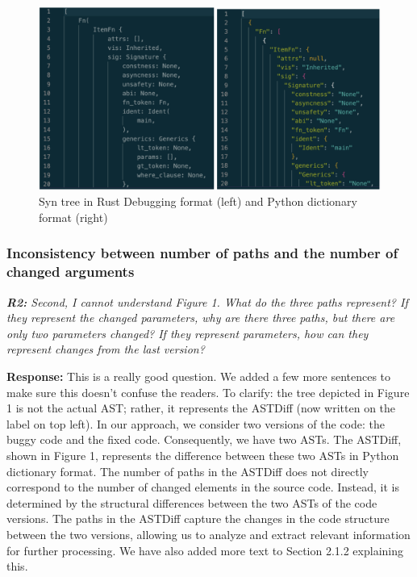 \documentclass{article}
\begin{document}
\begin{figure}[h]
    \centering
    \includegraphics[width=1\textwidth]{astpics}
    \caption{Syn tree in Rust Debugging format (left) and Python dictionary format (right)}
\end{figure}

\subsubsection{\label{rev:2:path}Inconsistency between number of paths and the number of changed arguments}

\textit{\textbf{R2:} Second, I cannot understand Figure 1. What do the three paths represent? If they represent the changed parameters, why are there three paths, but there are only two parameters changed? If they represent parameters, how can they represent changes from the last version?}

\vspace*{1em} \noindent \textbf{Response:} This is a really good question. We added a few more sentences to make sure this doesn't confuse the readers. To clarify: the tree depicted in Figure 1 is not the actual AST; rather, it represents the ASTDiff (now written on the label on top left). In our approach, we consider two versions of the code: the buggy code and the fixed code. Consequently, we have two ASTs. The ASTDiff, shown in Figure 1, represents the difference between these two ASTs in Python dictionary format. The number of paths in the ASTDiff does not directly correspond to the number of changed elements in the source code. Instead, it is determined by the structural differences between the two ASTs of the code versions. The paths in the ASTDiff capture the changes in the code structure between the two versions, allowing us to analyze and extract relevant information for further processing. We have also added more text to Section 2.1.2 explaining this.
\end{document}
